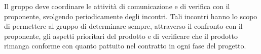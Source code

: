 Il gruppo deve coordinare le attivit\`{a} di comunicazione e di verifica con il proponente, svolgendo periodicamente degli incontri. Tali incontri hanno lo scopo di permettere al gruppo di determinare sempre, attraverso il confronto con il proponente, gli aspetti prioritari del prodotto e di verificare che il prodotto rimanga conforme con quanto pattuito nel contratto in ogni fase del progetto.
